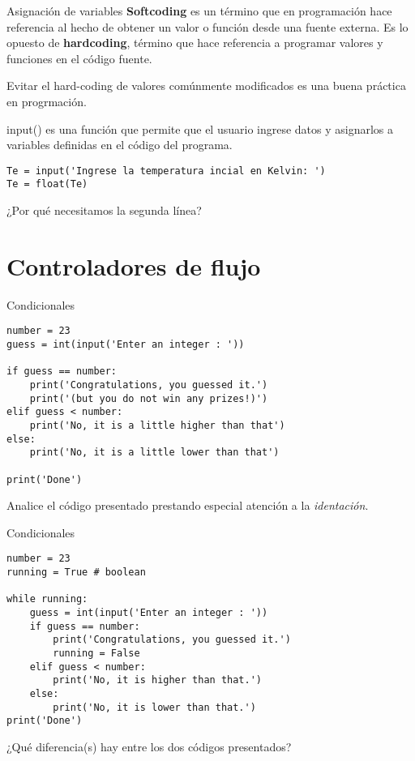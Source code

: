 \documentclass[10pt]{beamer}
\begin{document}
\begin{frame}[fragile]{Asignación de variables}
\textbf{Softcoding} es un término que en programación hace referencia al hecho de obtener un valor o función desde una fuente externa. Es lo opuesto de \textbf{hardcoding}, término que hace referencia a programar valores y funciones en el código fuente.

Evitar el hard-coding de valores comúnmente modificados es una buena práctica en progrmación.

\alert{input()} es una función que permite que el usuario ingrese datos y asignarlos a variables definidas en el código del programa.
	
	\begin{verbatim}
Te = input('Ingrese la temperatura incial en Kelvin: ')
Te = float(Te) 
	\end{verbatim}
	
	\begin{center}
		¿Por qué necesitamos la segunda línea?
	\end{center}
\end{frame}

\section{Controladores de flujo}
\begin{frame}[fragile]{Condicionales}
   \begin{verbatim}
number = 23
guess = int(input('Enter an integer : '))

if guess == number:
	print('Congratulations, you guessed it.')
	print('(but you do not win any prizes!)')
elif guess < number:
	print('No, it is a little higher than that')
else:
	print('No, it is a little lower than that')

print('Done')
   \end{verbatim}
\begin{center}
	Analice el código presentado prestando especial atención a la \emph{identación}.
\end{center}
\end{frame}

\begin{frame}[fragile]{Condicionales}
 \begin{verbatim}
number = 23
running = True # boolean

while running:
	guess = int(input('Enter an integer : '))
	if guess == number:
		print('Congratulations, you guessed it.')
		running = False
	elif guess < number:
		print('No, it is higher than that.')
	else:
		print('No, it is lower than that.')
print('Done')
\end{verbatim}
\begin{center}
	¿Qué diferencia(s) hay entre los dos códigos presentados?
\end{center}  
\end{frame}
\end{document}
